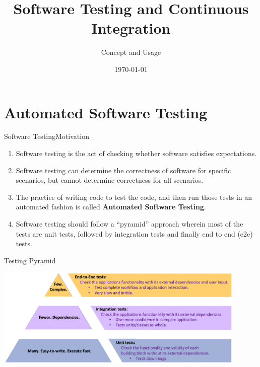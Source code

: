 \documentclass{setbeamer}
\title{Software Testing and Continuous Integration}
\subtitle{Concept and Usage}
\institute{\theChairName\\\theDepartmentName\\\theUniversityName}
\date[\today]{\today}
\begin{document}
\maketitle

\section{Automated Software Testing}

\begin{frame}{Software Testing}{Motivation}
    \begin{enumerate}
        \item Software testing is the act of checking whether software satisfies expectations.
        \item Software testing can determine the correctness of software for specific scenarios, 	but cannot determine correctness for all scenarios.
        \item The practice of writing code to test the code,
and then run those tests in an automated fashion is called \textbf{Automated Software Testing}.
		\item Software testing should follow a ``pyramid'' approach wherein most of the tests are unit tests, followed by integration tests and finally end to end (e2e) tests.
    \end{enumerate}
    
\end{frame}

\begin{frame}{Testing Pyramid}

\vspace{1cm}

	\centering
    \includegraphics[width=12cm]{resources/test_pyramid.png}
    
\end{frame}
\end{document}
